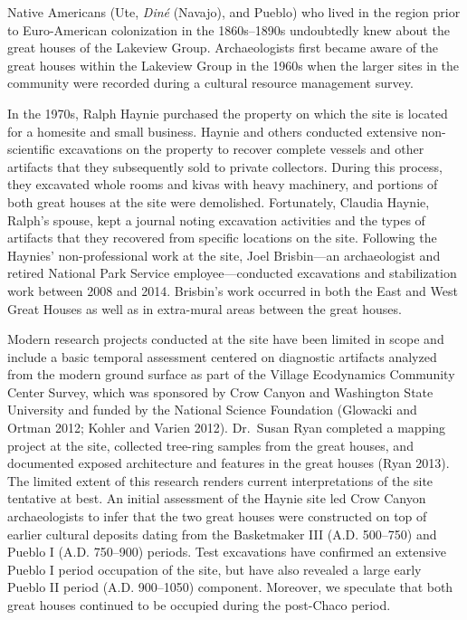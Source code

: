 \documentclass[
  12pt,
]{krantz}
\begin{document}
Native Americans (Ute, \emph{Diné} (Navajo), and Pueblo) who lived in the
region prior to Euro-American colonization in the 1860s--1890s
undoubtedly knew about the great houses of the Lakeview Group.
Archaeologists first became aware of the great houses within the
Lakeview Group in the 1960s when the larger sites in the community were
recorded during a cultural resource management survey.

In the 1970s, Ralph Haynie purchased the property on which the site is
located for a homesite and small business. Haynie and others conducted
extensive non-scientific excavations on the property to recover complete
vessels and other artifacts that they subsequently sold to private
collectors. During this process, they excavated whole rooms and kivas
with heavy machinery, and portions of both great houses at the site were
demolished. Fortunately, Claudia Haynie, Ralph's spouse, kept a journal
noting excavation activities and the types of artifacts that they
recovered from specific locations on the site. Following the Haynies'
non-professional work at the site, Joel Brisbin---an archaeologist and
retired National Park Service employee---conducted excavations and
stabilization work between 2008 and 2014. Brisbin's work occurred in
both the East and West Great Houses as well as in extra-mural areas
between the great houses.

Modern research projects conducted at the site have been limited in
scope and include a basic temporal assessment centered on diagnostic
artifacts analyzed from the modern ground surface as part of the Village
Ecodynamics Community Center Survey, which was sponsored by Crow Canyon
and Washington State University and funded by the National Science
Foundation (Glowacki and Ortman 2012; Kohler and Varien 2012). Dr.~Susan
Ryan completed a mapping project at the site, collected tree-ring
samples from the great houses, and documented exposed architecture and
features in the great houses (Ryan 2013). The limited extent of this
research renders current interpretations of the site tentative at best.
An initial assessment of the Haynie site led Crow Canyon archaeologists
to infer that the two great houses were constructed on top of earlier
cultural deposits dating from the Basketmaker III (A.D. 500--750) and
Pueblo I (A.D. 750--900) periods. Test excavations have confirmed an
extensive Pueblo I period occupation of the site, but have also revealed
a large early Pueblo II period (A.D. 900--1050) component. Moreover, we
speculate that both great houses continued to be occupied during the
post-Chaco period.
\end{document}
